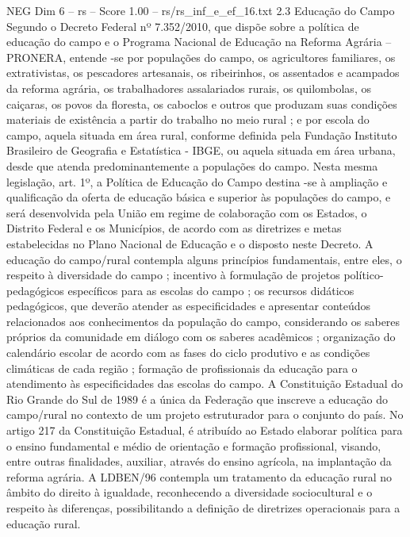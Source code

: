 \begin{textsample}{NEG Dim 6 – rs – Score 1.00 – rs/rs\_inf\_e\_ef\_16.txt}  \label{ex:f6_neg_104}
2.3 Educação do Campo Segundo o Decreto Federal nº 7.352/2010, que dispõe sobre a política de educação do campo e o Programa Nacional de Educação na Reforma Agrária – PRONERA, entende -se por populações do campo, os agricultores familiares, os extrativistas, os pescadores artesanais, os ribeirinhos, os assentados e acampados da reforma agrária, os trabalhadores assalariados rurais, os quilombolas, os caiçaras, os povos da floresta, os caboclos e outros que produzam suas condições materiais de existência a partir do trabalho no meio rural ; e por escola do campo, aquela situada em área rural, conforme definida pela Fundação Instituto Brasileiro de Geografia e Estatística - IBGE, ou aquela situada em área urbana, desde que atenda predominantemente a populações do campo.
Nesta mesma legislação, art. 1º, a Política de Educação do Campo destina -se à ampliação e qualificação da oferta de educação básica e superior às populações do campo, e será desenvolvida pela União em regime de colaboração com os Estados, o Distrito Federal e os Municípios, de acordo com as diretrizes e metas estabelecidas no Plano Nacional de Educação e o disposto neste Decreto.
A educação do campo/rural contempla alguns princípios fundamentais, entre eles, o respeito à diversidade do campo ; incentivo à formulação de projetos político-pedagógicos específicos para as escolas do campo ; os recursos didáticos pedagógicos, que deverão atender as especificidades e apresentar conteúdos relacionados aos conhecimentos da população do campo, considerando os saberes próprios da comunidade em diálogo com os saberes acadêmicos ; organização do calendário escolar de acordo com as fases do ciclo produtivo e as condições climáticas de cada região ; formação de profissionais da educação para o atendimento às especificidades das escolas do campo.
A Constituição Estadual do Rio Grande do Sul de 1989 é a única da Federação que inscreve a educação do campo/rural no contexto de um projeto estruturador para o conjunto do país.
No artigo 217 da Constituição Estadual, é atribuído ao Estado elaborar política para o ensino fundamental e médio de orientação e formação profissional, visando, entre outras finalidades, auxiliar, através do ensino agrícola, na implantação da reforma agrária.
A LDBEN/96 contempla um tratamento da educação rural no âmbito do direito à igualdade, reconhecendo a diversidade sociocultural e o respeito às diferenças, possibilitando a definição de diretrizes operacionais para a educação rural.

\end{textsample}
